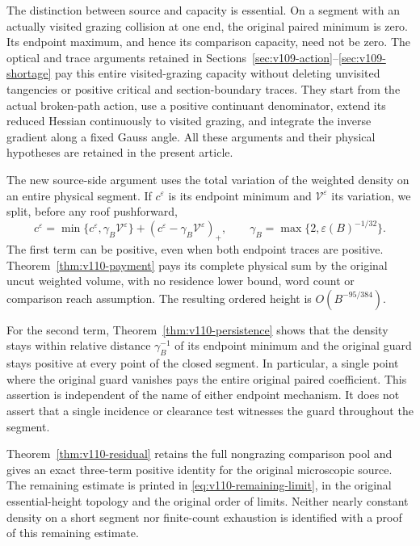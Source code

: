 \documentclass[11pt,reqno]{amsart}
\numberwithin{equation}{section}
\theoremstyle{definition}\newtheorem{definition}[theorem]{Definition}
\theoremstyle{remark}\newtheorem{remark}[theorem]{Remark}
\begin{document}
The distinction between source and capacity is essential. On a
segment with an actually visited grazing collision at one end, the
original paired minimum is zero. Its endpoint maximum, and hence its
comparison capacity, need not be zero. The optical and trace arguments
retained in Sections~\ref{sec:v109-action}--\ref{sec:v109-shortage}
pay this entire visited-grazing capacity without deleting unvisited
tangencies or positive critical and section-boundary traces.
They start from the actual broken-path action, use a positive
continuant denominator, extend its reduced Hessian continuously to
visited grazing, and integrate the inverse gradient along a fixed
Gauss angle. All these arguments and their physical hypotheses are
retained in the present article.

The new source-side argument uses the total variation of the
weighted density on an entire physical segment. If $c^\varepsilon$
is its endpoint minimum and $\mathcal V^\varepsilon$ its variation,
we split, before any roof pushforward,
\[
 c^\varepsilon
   =\min\{c^\varepsilon,\gamma_B\mathcal V^\varepsilon\}
       +(c^\varepsilon-\gamma_B\mathcal V^\varepsilon)_+,
 \qquad \gamma_B=\max\{2,\varepsilon(B)^{-1/32}\}.
\]
The first term can be positive, even when both endpoint traces are
positive. Theorem~\ref{thm:v110-payment} pays its complete physical
sum by the original uncut weighted volume, with no residence lower
bound, word count or comparison reach assumption. The resulting
ordered height is $O(B^{-95/384})$.

For the second term, Theorem~\ref{thm:v110-persistence} shows that the
density stays within relative distance $\gamma_B^{-1}$ of its
endpoint minimum and the original guard stays positive at every
point of the closed segment. In particular, a single point where
the original guard vanishes pays the entire original paired
coefficient. This assertion is independent of the name of either
endpoint mechanism. It does not assert that a single incidence or
clearance test witnesses the guard throughout the segment.

Theorem~\ref{thm:v110-residual} retains the full nongrazing comparison
pool and gives an exact three-term positive identity for the
original microscopic source. The remaining estimate is printed in
\eqref{eq:v110-remaining-limit}, in the original essential-height
topology and the original order of limits. Neither nearly constant
density on a short segment nor finite-count exhaustion is identified
with a proof of this remaining estimate.
\end{document}
